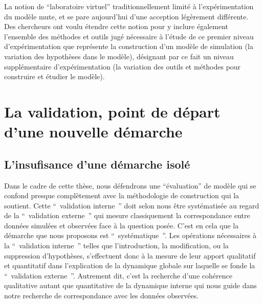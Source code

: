 La notion de \enquote{laboratoire virtuel} traditionnellement limité à l'expérimentation du modèle mute, et se pare aujourd'hui d'une acception légèrement différente. Des chercheurs \autocite{Schmitt2014} \autocite{Amblard2003} ont voulu étendre cette notion pour y inclure également l'ensemble des méthodes et outils jugé nécessaire à l'étude de ce premier niveau d'expérimentation que représente la construction d'un modèle de simulation (la variation des hypothèses dans le modèle), désignant par ce fait un niveau supplémentaire d’expérimentation (la variation des outils et méthodes pour construire et étudier le modèle). 



\section{La validation, point de départ d'une nouvelle démarche}

\subsection{L'insufisance d'une démarche isolé}

Dans le cadre de cette thèse, nous défendrons une \enquote{évaluation} de modèle qui se confond presque complètement avec la méthodologie de construction qui la soutient. Cette \enquote{ validation interne } doit selon nous être systématisée au regard de la \enquote{ validation externe } qui mesure classiquement la correspondance entre données simulées et observées face à la question posée. C’est en cela que la démarche que nous proposons est \enquote{ systématique }. Les opérations nécessaires à la \enquote{ validation interne } telles que l'introduction, la modification, ou la suppression d'hypothèses, s’effectuent donc à la mesure de leur apport qualitatif et quantitatif dans l'explication de la dynamique globale sur laquelle se fonde la \enquote{ validation externe }. Autrement dit, c'est la recherche d'une cohérence qualitative autant que quantitative de la dynamique interne qui nous guide dans notre recherche de correspondance avec les données observées.

